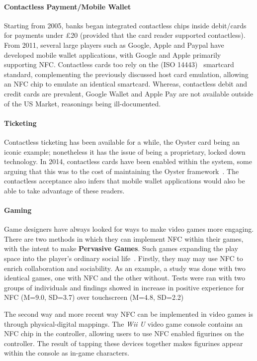 \paragraph{Contactless Payment/Mobile Wallet}
Starting from 2005, banks began integrated contactless chips inside debit/cards for payments under £20 (provided that the card reader supported contactless). From 2011, several large players such as Google, Apple and Paypal have developed mobile wallet applications, with Google and Apple primarily supporting NFC. Contactless cards too rely on the (ISO 14443)~\cite{iso14443} smartcard standard, complementing the previously discussed host card emulation, allowing an NFC chip to emulate an identical smartcard. Whereas, contactless debit and credit cards are prevalent, Google Wallet and Apple Pay are not available outside of the US Market, reasonings being ill-documented.
\paragraph{Ticketing}
Contactless ticketing has been available for a while, the Oyster card being an iconic example; nonetheless it has the issue of being a proprietary, locked down technology. In 2014, contactless cards have been enabled within the system, some arguing that this was to the cost of maintaining the Oyster framework~\cite{oystercosts}. The contactless acceptance also infers that mobile wallet applications would also be able to take advantage of these readers.
\paragraph{Gaming}
Game designers have always looked for ways to make video games more engaging. There are two methods in which they can implement NFC within their games, with the intent to make \textbf{Pervasive Games}. Such games expanding the play space into the player's ordinary social life~\cite{montola2005exploring}. Firstly, they may may use NFC to enrich collaboration and sociability. As an example, a study was done with two identical games, one with NFC and the other without. Tests were ran with two groups of individuals and findings showed in increase in positive experience for NFC (M=9.0, SD=3.7) over touchscreen (M=4.8, SD=2.2)~\cite{wolbert2013evaluating} 

The second way and more recent way NFC can be implemented in video games is through physical-digital mappings. The \emph{Wii U} video game console contains an NFC chip in the controller, allowing users to use NFC enabled figurines on the controller. The result of tapping these devices together makes figurines appear within the console as in-game characters. 

